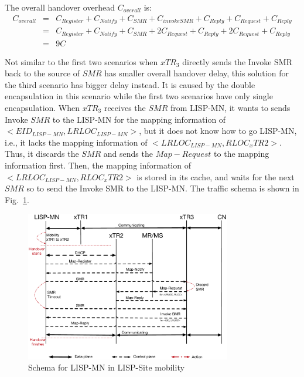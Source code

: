 The overall handover overhead $C_{overall}$ is:
\begin{eqnarray}
C_{overall} &=& C_{Register} + C_{Notify} + C_{SMR} + C_{invokeSMR} + C_{Reply} + C_{Request} + C_{Reply} \nonumber \\
&=& C_{Register} + C_{Notify} + C_{SMR} + 2C_{Request} + C_{Reply} + 2C_{Request} + C_{Reply} \nonumber \\
&=& 9 C
\end{eqnarray}

Not similar to the first two scenarios when $xTR_3$ directly sends the Invoke SMR back to the source of $SMR$ has smaller overall handover delay, this solution for the third scenario has bigger delay instead. It is caused by the double encapsulation in this scenario while the first two scenarios have only single encapsulation. When $xTR_3$ receives the $SMR$ from LISP-MN, it wants to sends Invoke $SMR$ to the LISP-MN for the mapping information of $<EID_{LISP-MN}, LRLOC_{LISP-MN}>$, but it does not know how to go LISP-MN, i.e., it lacks the mapping information of $<LRLOC_{LISP-MN}, RLOC_xTR2>$. Thus, it discards the $SMR$ and sends the $Map-Request$ to the mapping information first. Then, the mapping information of $<LRLOC_{LISP-MN}, RLOC_xTR2>$ is stored in its cache, and waits for the next $SMR$ so to send the Invoke SMR to the LISP-MN. The traffic schema is shown in Fig.~\ref{Mobility_double_encap_schema_SMR_askxTR_simplify}.
\begin{figure}[!th]
	\centering
	\includegraphics[width=0.8\textwidth]{Pics/Mobility_double_encap_schema_SMR_askxTR_simplify}
	\caption{Schema for LISP-MN in LISP-Site mobility}
	\label{Mobility_double_encap_schema_SMR_askxTR_simplify}
\end{figure}

